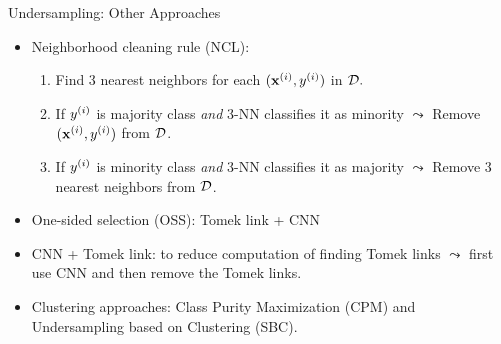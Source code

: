 \documentclass[11pt,compress,t,notes=noshow, xcolor=table]{beamer}
\begin{document}
\begin{frame}{Undersampling: Other Approaches}

    \begin{itemize}

        \item Neighborhood cleaning rule (NCL):
    
        \begin{enumerate}
            
            \item Find 3 nearest neighbors for each $(\mathbf{x}^{(i)},y^{(i)})$ in $\mathcal{D}.$
        
            \item If $y^{(i)}$ is majority class \emph{and} 3-NN classifies it as minority $\leadsto$ Remove $(\mathbf{x}^{(i)},y^{(i)})$ from $\mathcal{D}$.
        
            \item If $y^{(i)}$ is minority class \emph{and} 3-NN classifies it as majority $\leadsto$ Remove 3 nearest neighbors from $\mathcal{D}$.
        
        \end{enumerate} 
    
        \item One-sided selection (OSS): Tomek link + CNN

        \item CNN + Tomek link: to reduce computation of finding Tomek links $\leadsto$ first use CNN and then remove the Tomek links.
    
        \item Clustering approaches: Class Purity Maximization (CPM) and Undersampling based on Clustering (SBC).

    \end{itemize}

\end{frame}
	
\end{document}
